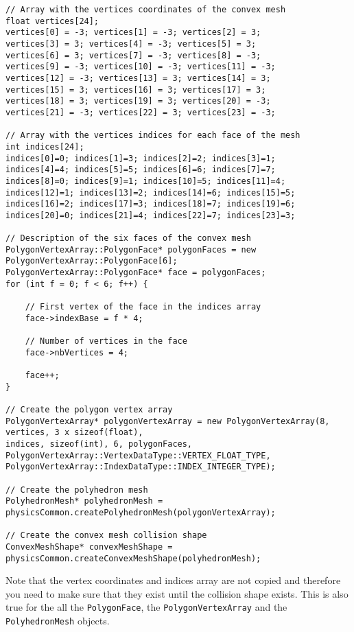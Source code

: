\documentclass[a4paper,12pt]{article}
\begin{document}
    \begin{lstlisting}
// Array with the vertices coordinates of the convex mesh
float vertices[24];
vertices[0] = -3; vertices[1] = -3; vertices[2] = 3;
vertices[3] = 3; vertices[4] = -3; vertices[5] = 3;
vertices[6] = 3; vertices[7] = -3; vertices[8] = -3;
vertices[9] = -3; vertices[10] = -3; vertices[11] = -3;
vertices[12] = -3; vertices[13] = 3; vertices[14] = 3;
vertices[15] = 3; vertices[16] = 3; vertices[17] = 3;
vertices[18] = 3; vertices[19] = 3; vertices[20] = -3;
vertices[21] = -3; vertices[22] = 3; vertices[23] = -3;

// Array with the vertices indices for each face of the mesh
int indices[24];
indices[0]=0; indices[1]=3; indices[2]=2; indices[3]=1;
indices[4]=4; indices[5]=5; indices[6]=6; indices[7]=7;
indices[8]=0; indices[9]=1; indices[10]=5; indices[11]=4;
indices[12]=1; indices[13]=2; indices[14]=6; indices[15]=5;
indices[16]=2; indices[17]=3; indices[18]=7; indices[19]=6;
indices[20]=0; indices[21]=4; indices[22]=7; indices[23]=3;

// Description of the six faces of the convex mesh
PolygonVertexArray::PolygonFace* polygonFaces = new PolygonVertexArray::PolygonFace[6];
PolygonVertexArray::PolygonFace* face = polygonFaces;
for (int f = 0; f < 6; f++) {

    // First vertex of the face in the indices array
    face->indexBase = f * 4;   

    // Number of vertices in the face
    face->nbVertices = 4;

    face++;
}

// Create the polygon vertex array
PolygonVertexArray* polygonVertexArray = new PolygonVertexArray(8, vertices, 3 x sizeof(float),
indices, sizeof(int), 6, polygonFaces,
PolygonVertexArray::VertexDataType::VERTEX_FLOAT_TYPE,
PolygonVertexArray::IndexDataType::INDEX_INTEGER_TYPE);

// Create the polyhedron mesh
PolyhedronMesh* polyhedronMesh = physicsCommon.createPolyhedronMesh(polygonVertexArray);

// Create the convex mesh collision shape
ConvexMeshShape* convexMeshShape = physicsCommon.createConvexMeshShape(polyhedronMesh);
  \end{lstlisting}

    \vspace{0.6cm}

    Note that the vertex coordinates and indices array are not copied and therefore you need to make sure that they exist until the collision shape
    exists. This is also true for the all the \texttt{PolygonFace}, the \texttt{PolygonVertexArray} and the \texttt{PolyhedronMesh} objects. \\
\end{document}
